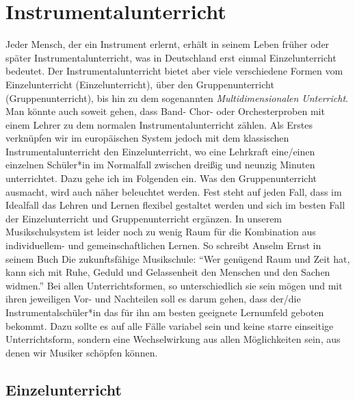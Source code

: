 \section{Instrumentalunterricht}

Jeder Mensch, der ein Instrument erlernt, erhält in seinem Leben früher oder
später Instrumentalunterricht, was in Deutschland erst einmal Einzelunterricht
bedeutet. Der Instrumentalunterricht bietet aber viele verschiedene Formen vom
Einzelunterricht (Einzelunterricht), über den Gruppenunterricht (Gruppenunterricht), bis hin zu dem
sogenannten \emph{Multidimensionalen Unterricht}. Man könnte auch soweit gehen,
dass Band- Chor- oder Orchesterproben mit einem Lehrer zu dem normalen
Instrumentalunterricht zählen. Als Erstes verknüpfen wir im europäischen System
jedoch mit dem klassischen Instrumentalunterricht den Einzelunterricht, wo eine
Lehrkraft eine/einen einzelnen Schüler*in im Normalfall zwischen dreißig und neunzig
Minuten unterrichtet. Dazu gehe ich im Folgenden ein. Was den Gruppenunterricht
ausmacht, wird auch näher beleuchtet werden. Fest steht auf jeden Fall, dass im
Idealfall das Lehren und Lernen flexibel gestaltet werden und sich im besten
Fall der Einzelunterricht und Gruppenunterricht ergänzen. In unserem Musikschulsystem ist leider noch zu
wenig Raum für die Kombination aus individuellem- und gemeinschaftlichen Lernen.
So schreibt Anselm Ernst in seinem Buch Die zukunftsfähige Musikschule:
\enquote{Wer genügend Raum und Zeit hat, kann sich mit Ruhe, Geduld und
Gelassenheit den Menschen und den Sachen widmen.}
\autocite[84]{ernst:die_zukunftsfaehige_musikschule} Bei allen
Unterrichtsformen, so unterschiedlich sie sein mögen und mit ihren jeweiligen
Vor- und Nachteilen soll es darum gehen, dass der/die Instrumentalschüler*in das
für ihn am besten geeignete Lernumfeld geboten bekommt. Dazu sollte es auf alle
Fälle variabel sein und keine starre einseitige Unterrichtsform, sondern eine
Wechselwirkung aus allen Möglichkeiten sein, aus denen wir Musiker schöpfen
können. 


\subsection{Einzelunterricht}

